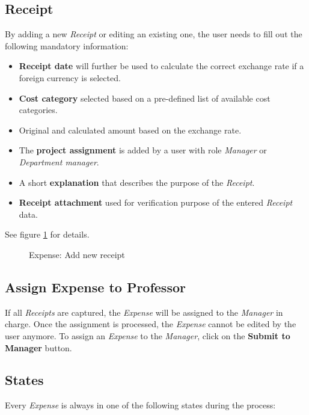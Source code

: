 \subsection{Receipt}
\label{sec:addreceipt}
By adding a new \textit{Receipt} or editing an existing one, the user needs to fill out the following mandatory information:
\begin{itemize}
    \item \textbf{Receipt date} will further be used to calculate the correct exchange rate if a foreign currency is selected.
    \item \textbf{Cost category} selected based on a pre-defined list of available cost categories.
    \item Original and calculated amount based on the exchange rate.
    \item The \textbf{project assignment} is added by a user with role \textit{Manager} or \textit{Department manager}.
    \item A short \textbf{explanation} that describes the purpose of the \textit{Receipt}.
    \item \textbf{Receipt attachment} used for verification purpose of the entered \textit{Receipt} data.
\end{itemize}

See figure \ref{fig:expenses-add01} for details.


\begin{figure}[H]
    \centering
    \caption{Expense: Add new receipt}
    \label{fig:expenses-add01}
\end{figure}

\subsection{Assign Expense to Professor}
If all \textit{Receipts} are captured, the \textit{Expense} will be assigned to the \textit{Manager} in charge. Once the assignment is processed, the \textit{Expense} cannot be edited by the user anymore. To assign an \textit{Expense} to the \textit{Manager}, click on the \textbf{Submit to Manager} button.

\subsection{States}
\label{sec:states}
Every \textit{Expense} is always in one of the following states during the process:

